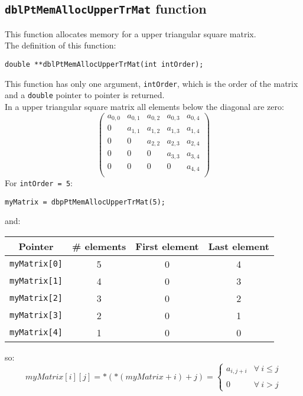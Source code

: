 \subsection{\texttt{dblPtMemAllocUpperTrMat} function} \label{sec:dblPtMemAllocUpperTrMat}

This function allocates memory for a upper triangular square matrix.\\

The definition of this function:
%
\begin{verbatim}
double **dblPtMemAllocUpperTrMat(int intOrder);
\end{verbatim}

This function has only one argument, \texttt{intOrder}, which is the order of the matrix and a \texttt{double} pointer to pointer is returned.\\

In a upper triangular square matrix all elements below the diagonal are zero: 
%
\begin{displaymath}
\left( \begin{array}{ccccc}
  a_{0,0} & a_{0,1} & a_{0,2} & a_{0,3} & a_{0,4} \\
  0      & a_{1,1} & a_{1,2} & a_{1,3} & a_{1,4} \\ 
  0      & 0      & a_{2,2} & a_{2,3} & a_{2,4} \\
  0      & 0      & 0      & a_{3,3} & a_{3,4} \\
  0      & 0      & 0      & 0      & a_{4,4} \\
\end{array} \right)
\end{displaymath}
%
For \texttt{intOrder = 5}:
%
\begin{verbatim}
myMatrix = dbpPtMemAllocUpperTrMat(5);  
\end{verbatim}
%
and:
\begin{center}
  \begin{tabular}{|c|c|c|c|}
    \hline
    \textbf{Pointer} & \textbf{\# elements} & \textbf{First element} & \textbf{Last element}\\
    \hline
    \texttt{myMatrix[0]} & 5 & 0 & 4\\
    \hline
    \texttt{myMatrix[1]} & 4 & 0 & 3\\
    \hline
    \texttt{myMatrix[2]} & 3 & 0 & 2\\
    \hline
    \texttt{myMatrix[3]} & 2 & 0 & 1\\
    \hline
    \texttt{myMatrix[4]} & 1 & 0 & 0\\
    \hline
  \end{tabular}
\end{center}
%
so:
%
\begin{displaymath}
  myMatrix[i][j] = *(*(myMatrix + i) + j) = \left\{ \begin{array}{ll}
    a_{i,j+i} & \forall \ i \le j \\
     & \\
    0 & \forall \ i > j
    \end{array} \right.    
\end{displaymath}

